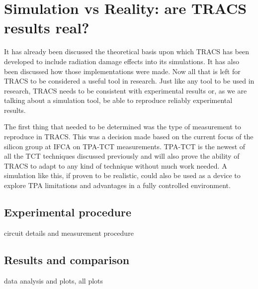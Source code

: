 \chapter{Simulation vs Reality: are TRACS results real?}

It has already been discussed the theoretical basis upon which TRACS has been developed to include radiation damage effects into its simulations. It has also been discussed how those implementations were made. Now all that is left for TRACS to be considered a useful tool in research. Just like any tool to be used in research, TRACS needs to be consistent with experimental results or, as we are talking about a simulation tool, be able to reproduce reliably experimental results.

The first thing that needed to be determined was the type of measurement to reproduce in TRACS. This was a decision made based on the current focus of the silicon group at IFCA \iffalse No se el nombre oficial \fi on TPA-TCT measurements. TPA-TCT is the newest of all the TCT techniques discussed previously and will also prove the ability of TRACS to adapt to any kind of technique without much work needed. A simulation like this, if proven to be realistic, could also be used as a device to explore TPA limitations and advantages in a fully controlled environment.


\section{Experimental procedure} %
\label{sec:future_improvements}

circuit details and measurement procedure


\section{Results and comparison} %
\label{sec:future_proyection}

data analysis and plots, all plots 


